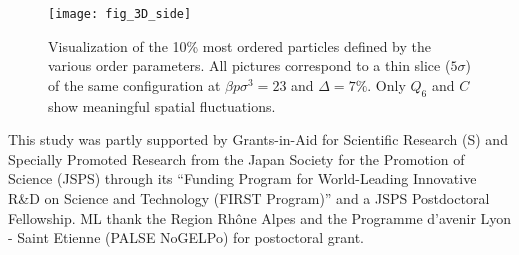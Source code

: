 \documentclass{vl4}
\begin{document}
\begin{figure}[b]
	\centering
	\texttt{[image: fig\_3D\_side]}
	\caption{Visualization of the 10\% most ordered particles defined by the various order parameters. All pictures correspond to a thin slice ($5\sigma$) of the same configuration at $\beta p\sigma^3=23$ and $\Delta=7\%$. Only $Q_6$ and $C$ show meaningful spatial fluctuations.}
	\label{fig:3D}
\end{figure}



\begin{acknowledgments}
This study was partly supported by Grants-in-Aid for Scientific Research (S) and Specially Promoted Research from the Japan Society for the Promotion of
Science (JSPS) through its ``Funding Program for World-Leading
Innovative R\&D on Science and Technology (FIRST Program)'' and a JSPS Postdoctoral Fellowship.
ML thank the Region Rhône Alpes and the Programme d'avenir Lyon - Saint Etienne (PALSE NoGELPo) for postoctoral grant.
\end{acknowledgments}



\end{document}
